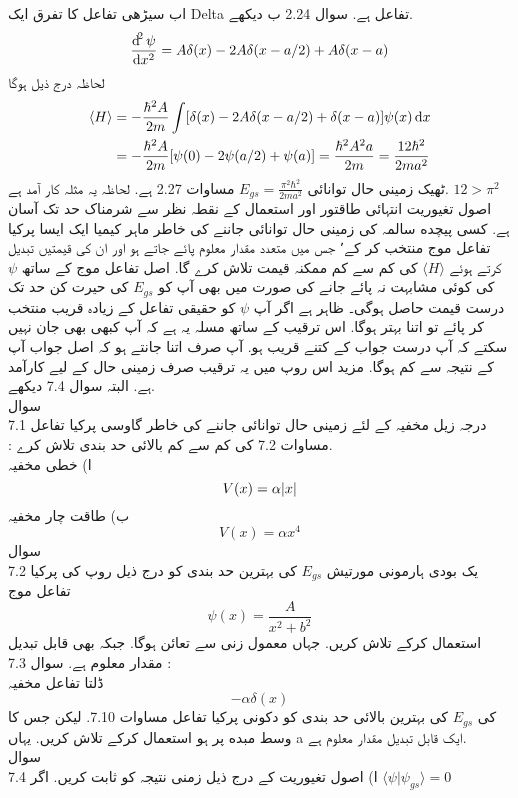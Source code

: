  اب سیڑھی تفاعل کا تفرق ایک Delta تفاعل ہے. سوال 2.24 ب دیکھے.
\[\frac{\dif^{2}{\psi}}{\dif{x^{2}}}=A\delta(x)-2A\delta(x-a/2)+A\delta(x-a)\]
لحاظہ درج ذیل ہوگا 
\begin{align*}
\langle H \rangle &= -\frac{\hbar^{2}A}{2m}\int[\delta(x)-2A\delta(x-a/2)+\delta(x-a)]\psi(x)\dif{x}\\
&= -\frac{\hbar^{2}A}{2m}[\psi(0)-2\psi(a/2)+\psi(a)]=\frac{\hbar^{2}A^{2}a}{2m}=\frac{12\hbar^{2}}{2ma^{2}}\\
\end{align*}
ٹھیک زمینی حال توانائی
\(E_{gs}=\frac{\pi^{2}\hbar^{2}}{2ma^{2}}\)
مساوات 2.27 ہے. لحاظہ یہ مثلہ کار آمد ہے. 
\(12>\pi^{2}\)\\

اصول تغيوریت انتہائی طاقتور اور استعمال کے نقطہ نظر سے شرمناک حد تک آسان ہے. کسی پیچده سالمہ کی زمینی حال توانائی جاننے کی خاطر ماہر کیمیا ایک ایسا پرکیا تفاعل موج منتخب کر کے٬ جس میں متعدد مقدار معلوم پائے جاتے ہو اور ان کی قیمتیں تبديل کرتے ہوئے
\( \langle H \rangle\)
کی کم سے کم ممکنہ قیمت تلاش کرے گا. اصل تفاعل موج کے ساتھ
\(\psi\) 
کی کوئی مشابہت نہ پائے جانے کی صورت میں بھی آپ کو
\( E_{gs}\)
 کی حیرت کن حد تک درست قیمت حاصل ہوگی۔ ظاہر ہے اگر آپ
\(\psi\) 
 کو حقیقی تفاعل کے زیادہ قریب منتخب کر پائے تو اتنا بہتر ہوگا. اس ترقيب کے ساتھ مسلہ یہ ہے کہ آپ کبھی بھی جان نہیں سکتے کہ آپ درست جواب کے کتنے قريب ہو. آپ صرف اتنا جانتے ہو کہ اصل جواب آپ کے نتیجہ سے كم ہوگا. مزید اس روپ میں یہ ترقيب صرف زمینی حال کے لیے کارآمد ہے. البتہ سوال 7.4 دیکھے.\\
سوال \\7.1
درجہ زیل مخفیہ کے لئے زمينی حال توانائی جاننے کی خاطر گاوسی پرکیا تفاعل\\:
مساوات 7.2 کی كم سے كم بالائی حد بندی تلاش كرے.\\
ا) خطی مخفیہ
\[V(x)=\alpha\abs{x}\]
ب) طاقت چار مخفیہ
\[V(x)=\alpha x^{4}\]
سوال \\7.2
 یک بودی ہارمونی مورتیش 
 \(E_{gs}\)
 کی بہترین حد بندی کو درج ذیل روپ کی پرکیا تفاعل موج
\[\psi(x)=\frac{A}{x^{2}+b^{2}}\]
استعمال کرکے تلاش كریں. جہاں معمول زنی سے تعائن ہوگا. جبکہ بھی قابل تبديل مقدار معلوم ہے.
 سوال 7.3 : \\
 ڈلتا تفاعل مخفیہ
\[-\alpha\delta(x)\]
کی
\(E_{gs}\) 
کی بہترین بالائی حد بندی کو دکونی پرکیا تفاعل مساوات 7.10. لیکن جس کا وسط مبده پر ہو استعمال کرکے تلاش كريں. یہاں a ایک قابل تبديل مقدار معلوم ہے.\\
سوال \\7.4
ا) اصول تغيوريت کے درج ذیل زمنی نتیجہ کو ثابت کریں. اگر
\(\langle \psi | \psi_{gs} \rangle =0\)
